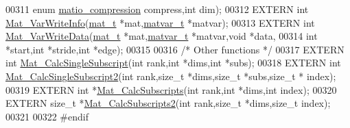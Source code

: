 \begin{DoxyCode}
00311                       \textcolor{keyword}{enum} \hyperlink{group___m_a_t_ga768c318af97bd2567758ecb001ceb7f4}{matio\_compression} compress,\textcolor{keywordtype}{int} dim);
00312 EXTERN \textcolor{keywordtype}{int}        \hyperlink{group___m_a_t_ga1ae164415dfd98cdf48ad07033b6e0bb}{Mat\_VarWriteInfo}(\hyperlink{struct__mat__t}{mat\_t} *mat,\hyperlink{group___m_a_t_structmatvar__t}{matvar\_t} *matvar);
00313 EXTERN \textcolor{keywordtype}{int}        \hyperlink{group___m_a_t_ga43179b930fb30c025a153a55a083a98a}{Mat\_VarWriteData}(\hyperlink{struct__mat__t}{mat\_t} *mat,\hyperlink{group___m_a_t_structmatvar__t}{matvar\_t} *matvar,\textcolor{keywordtype}{void} *data,
00314                       \textcolor{keywordtype}{int} *start,\textcolor{keywordtype}{int} *stride,\textcolor{keywordtype}{int} *edge);
00315 
00316 \textcolor{comment}{/* Other functions */}
00317 EXTERN \textcolor{keywordtype}{int}     \hyperlink{group___m_a_t_ga9b8d09f631538b14ca29792e0334e349}{Mat\_CalcSingleSubscript}(\textcolor{keywordtype}{int} rank,\textcolor{keywordtype}{int} *dims,\textcolor{keywordtype}{int} *subs);
00318 EXTERN \textcolor{keywordtype}{int}     \hyperlink{group___m_a_t_ga5f7923e9d61ad728c127439044c4ae0e}{Mat\_CalcSingleSubscript2}(\textcolor{keywordtype}{int} rank,\textcolor{keywordtype}{size\_t} *dims,\textcolor{keywordtype}{size\_t} *subs,\textcolor{keywordtype}{size\_t} *
      index);
00319 EXTERN \textcolor{keywordtype}{int}    *\hyperlink{group___m_a_t_gabe2571a4b9b6cff3b31aa6f152deba61}{Mat\_CalcSubscripts}(\textcolor{keywordtype}{int} rank,\textcolor{keywordtype}{int} *dims,\textcolor{keywordtype}{int} index);
00320 EXTERN \textcolor{keywordtype}{size\_t} *\hyperlink{group___m_a_t_ga5af1727403cfa3daa8567de39e1abe64}{Mat\_CalcSubscripts2}(\textcolor{keywordtype}{int} rank,\textcolor{keywordtype}{size\_t} *dims,\textcolor{keywordtype}{size\_t} index);
00321 
00322 \textcolor{preprocessor}{#endif}
\end{DoxyCode}
